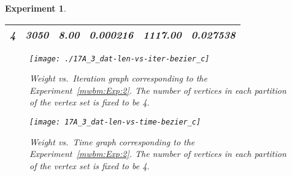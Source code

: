 \documentclass[runningheads,a4paper]{llncs}
\newtheorem{experiment}{Experiment}
\begin{document}
\begin{experiment}
\begin{table}[htpb]
{\begin{tabular}{|c|c|c|c|c|c|}
4 & 3050 & 8.00  & 0.000216 & 1117.00 & 0.027538 \\ \hline
\end{tabular}
}
\end{table}
\begin{figure}[htpb]
\centering
\texttt{[image: ./17A\_3\_dat-len-vs-iter-bezier\_c]}\caption{Weight vs.\ Iteration graph corresponding to the Experiment~\ref{mwbm:Exp:2}. The number of vertices in each  partition of the vertex set is fixed to be  4.}
\label{mwbm:Fig:Exp2:Iteration}
\end{figure}
\begin{figure}[htpb]
\centering
\texttt{[image: 17A\_3\_dat-len-vs-time-bezier\_c]}\caption{Weight vs.\ Time graph corresponding to the Experiment~\ref{mwbm:Exp:2}. The number of vertices in each  partition of the vertex set is fixed to be  4.}
\label{mwbm:Fig:Exp2:Time}
\end{figure}
\end{experiment}
\end{document}
